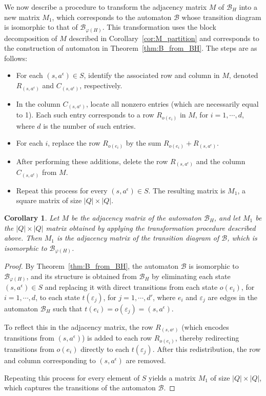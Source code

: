 \documentclass{article}
\newtheorem{mycor}{Corollary}[section]
\newcommand{\B}{\mathcal{B}}
\newcommand{\e}{\epsilon}
\newcommand{\ee}{\varepsilon}
\begin{document}
    We now describe a procedure to transform the adjacency matrix $M$ of $\B_H$ into a new matrix $M_1$, which corresponds to the automaton $\B$ whose transition diagram is isomorphic to that of $\B_{\varphi(H)}$. This transformation uses the block decomposition of $M$ described in Corollary~\ref{cor:M_partition} and corresponds to the construction of automaton in Theorem~\ref{thm:B_from_BH}. The steps are as follows: 
    \begin{itemize} 
    \item[1.]  For each $(s,a^{\e}) \in S$, identify the associated row and column in $M$, denoted $R_{(s,a^{\e})}$ and $C_{(s,a^{\e})}$, respectively.
    \item[2.] In the column $C_{(s,a^{\e})}$, locate all nonzero entries (which are necessarily equal to 1). Each such entry corresponds to a row $R_{o(e_i)}$ in $M$, for $i = 1, \cdots, d$, where $d$ is the number of such entries. 
    \item[3.] For each $i$, replace the row $R_{o(e_i)}$ by the sum $R_{o(e_i)} + R_{(s,a^{\e})}$.
    \item[4.] After performing these additions, delete the row $R_{(s,a^{\e})}$ and the column $C_{(s,a^{\e})}$ from $M$. 
    \item[5.] Repeat this process for every $(s,a^{\e}) \in S$. The resulting matrix is $M_1$, a square matrix of size $|Q|\times |Q|$.
    \end{itemize} 

    \begin{mycor}\label{cor:M1_from_M}
    Let $M$ be the adjacency matrix of the automaton $\B_H$, and let $M_1$ be the $|Q|\times |Q|$ matrix obtained by applying the transformation procedure described above. Then $M_1$ is the adjacency matrix of the transition diagram of $\B$, which is isomorphic to $\B_{\varphi(H)}$.
    \end{mycor}
    \begin{proof}
    By Theorem~\ref{thm:B_from_BH}, the automaton $\B$ is isomorphic to $\B_{\varphi(H)}$, and its structure is obtained from $\B_H$ by eliminating each state $(s,a^{\e}) \in S$ and replacing it with direct transitions from each state $o(e_i)$, for $i = 1,\cdots,d$, to each state $t(\ee_j)$, for $j = 1,\cdots,d'$, where $e_i$ and $\ee_j$ are edges in the automaton $\B_H$ such that $t(e_i) = o(\ee_j) = (s,a^{\e})$. 

    To reflect this in the adjacency matrix, the row $R_{(s,a^{\e})}$ (which encodes transitions from $(s,a^{\e})$) is added to each row $R_{o(e_i)}$, thereby redirecting transitions from $o(e_i)$ directly to each $t(\ee_j)$. After this redistribution, the row and column corresponding to $(s,a^{\e})$ are removed.

    Repeating this process for every element of $S$ yields a matrix $M_1$ of size $|Q|\times |Q|$, which captures the transitions of the automaton $\B$.
    \end{proof}
    
\end{document}
